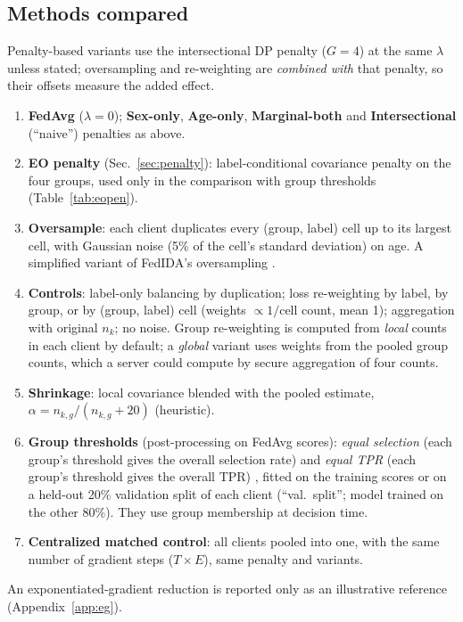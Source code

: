 \documentclass[conference]{IEEEtran}
\begin{document}
\subsection{Methods compared}
Penalty-based variants use the intersectional DP penalty ($G{=}4$) at the same $\lambda$ unless stated; oversampling and re-weighting are \emph{combined with} that penalty, so their offsets measure the added effect.
\begin{enumerate}
\item \textbf{FedAvg} ($\lambda{=}0$); \textbf{Sex-only}, \textbf{Age-only}, \textbf{Marginal-both} and \textbf{Intersectional} (``naive'') penalties as above.
\item \textbf{EO penalty} (Sec.~\ref{sec:penalty}): label-conditional covariance penalty on the four groups, used only in the comparison with group thresholds (Table~\ref{tab:eopen}).
\item \textbf{Oversample}: each client duplicates every (group, label) cell up to its largest cell, with Gaussian noise (5\% of the cell's standard deviation) on age. A simplified variant of FedIDA's oversampling \cite{wu2025fedida}.
\item \textbf{Controls}: label-only balancing by duplication; loss re-weighting by label, by group, or by (group, label) cell (weights $\propto1/$cell count, mean 1); aggregation with original $n_k$; no noise. Group re-weighting is computed from \emph{local} counts in each client by default; a \emph{global} variant uses weights from the pooled group counts, which a server could compute by secure aggregation of four counts.
\item \textbf{Shrinkage}: local covariance blended with the pooled estimate, $\alpha=n_{k,g}/(n_{k,g}+20)$ (heuristic).
\item \textbf{Group thresholds} (post-processing on FedAvg scores): \emph{equal selection} (each group's threshold gives the overall selection rate) and \emph{equal TPR} (each group's threshold gives the overall TPR) \cite{hardt2016}, fitted on the training scores or on a held-out 20\% validation split of each client (``val.\ split''; model trained on the other 80\%). They use group membership at decision time.
\item \textbf{Centralized matched control}: all clients pooled into one, with the same number of gradient steps ($T\!\times\!E$), same penalty and variants.
\end{enumerate}
An exponentiated-gradient reduction \cite{agarwal2018} is reported only as an illustrative reference (Appendix~\ref{app:eg}).
\end{document}
